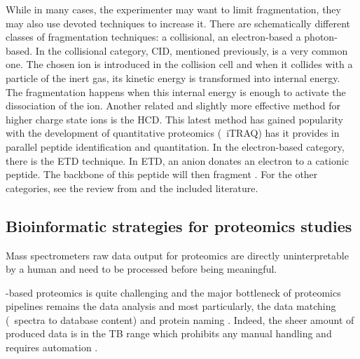 While in many cases, the experimenter may want to limit fragmentation, they may
also use devoted techniques to increase it. There are schematically different
classes of fragmentation techniques: a collisional, an
electron-based a photon-based. In the collisional category, \gls{CID},
mentioned previously, is a very common one. The chosen ion is introduced in the
collision cell and when it collides with a particle of the inert gas, its kinetic
energy is transformed into internal energy. The fragmentation happens when this
internal energy is enough to activate the dissociation of the ion. Another
related and slightly more effective method for higher charge state ions is the
\acrfull{HCD}. This latest method has gained popularity with the development of
quantitative proteomics (\eg\ \gls{iTRAQ}) has it provides in parallel peptide
identification and quantitation. In the electron-based category, there is the
\acrfull{ETD} technique. In \gls{ETD}, an anion donates an electron to a cationic
peptide. The backbone of this peptide will then fragment .
For the other categories, see the review from  and the included
literature.

\subsection{Bioinformatic strategies for proteomics studies}

Mass spectrometers raw data output for proteomics are directly uninterpretable
by a human and need to be processed before being meaningful.

\ms-based proteomics is quite challenging and the major bottleneck of
proteomics pipelines remains the data analysis  and
most particularly, the data matching (\ms\ spectra to database content) and
protein naming . Indeed, the sheer amount of produced data
is in the \gls{TB} range which prohibits any manual handling and requires
automation .

